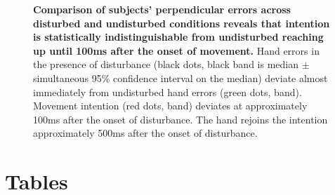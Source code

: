 \documentclass[10pt]{article}
\begin{document}
\begin{figure}[!ht]
\begin{center}
\end{center}
\caption{
{\bf Comparison of subjects' perpendicular errors across disturbed and undisturbed conditions reveals that intention is statistically indistinguishable from undisturbed reaching up until 100ms after the onset of movement.} Hand errors in the presence of disturbance (black dots, black band is median $\pm$ simultaneous 95\% confidence interval on the median) deviate almost immediately from undisturbed hand errors (green dots, band). Movement intention (red dots, band) deviates at approximately 100ms after the onset of disturbance. The hand rejoins the intention approximately 500ms after the onset of disturbance.
}
\label{fig:grouptrends}
\end{figure}

\section*{Tables}
\end{document}
